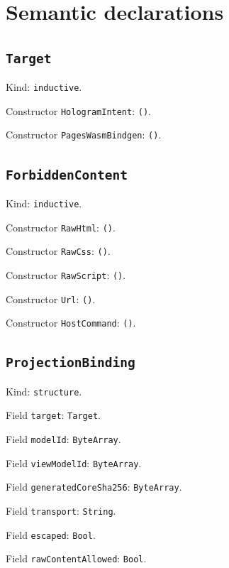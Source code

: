 \documentclass[11pt]{article}
\begin{document}
\section*{Semantic declarations}
\subsection*{\texttt{Target}}
\noindent Kind: \texttt{inductive}.\par
\noindent Constructor \texttt{HologramIntent}: \texttt{()}.\par
\noindent Constructor \texttt{PagesWasmBindgen}: \texttt{()}.\par
\subsection*{\texttt{ForbiddenContent}}
\noindent Kind: \texttt{inductive}.\par
\noindent Constructor \texttt{RawHtml}: \texttt{()}.\par
\noindent Constructor \texttt{RawCss}: \texttt{()}.\par
\noindent Constructor \texttt{RawScript}: \texttt{()}.\par
\noindent Constructor \texttt{Url}: \texttt{()}.\par
\noindent Constructor \texttt{HostCommand}: \texttt{()}.\par
\subsection*{\texttt{ProjectionBinding}}
\noindent Kind: \texttt{structure}.\par
\noindent Field \texttt{target}: \texttt{Target}.\par
\noindent Field \texttt{modelId}: \texttt{ByteArray}.\par
\noindent Field \texttt{viewModelId}: \texttt{ByteArray}.\par
\noindent Field \texttt{generatedCoreSha256}: \texttt{ByteArray}.\par
\noindent Field \texttt{transport}: \texttt{String}.\par
\noindent Field \texttt{escaped}: \texttt{Bool}.\par
\noindent Field \texttt{rawContentAllowed}: \texttt{Bool}.\par
\end{document}
